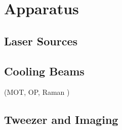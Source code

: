 
\chapter{Apparatus}
\label{ch:apparatus}

\section{Laser Sources}

\section{Cooling Beams}

(MOT, OP, Raman )

\section{Tweezer and Imaging}
